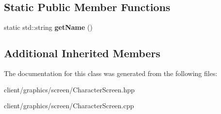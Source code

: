 \subsection*{Static Public Member Functions}
\begin{DoxyCompactItemize}
\item 
\hypertarget{classgraphics_1_1_character_screen_a9174903caf65d3567a7cfaf96648938a}{static std\-::string {\bfseries get\-Name} ()}\label{classgraphics_1_1_character_screen_a9174903caf65d3567a7cfaf96648938a}

\end{DoxyCompactItemize}
\subsection*{Additional Inherited Members}


The documentation for this class was generated from the following files\-:\begin{DoxyCompactItemize}
\item 
client/graphics/screen/Character\-Screen.\-hpp\item 
client/graphics/screen/Character\-Screen.\-cpp\end{DoxyCompactItemize}
